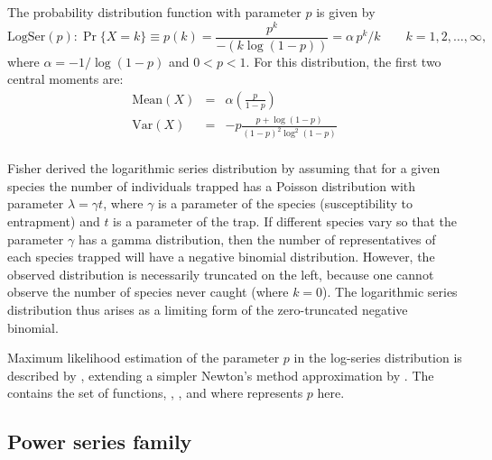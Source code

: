 \documentclass[10pt,krantz2]{krantz}\usepackage[]{graphicx}\usepackage[]{color}
\begin{document}
The probability distribution function with parameter $p$ is given by
\begin{equation}\label{eq:logseriesf}
\textrm{LogSer}(p): \Pr \{ X = k \} \equiv p ( k )  =
\frac{p^k}{-(k\log (1-p ))} =
\alpha \, p^k / k
\quad\quad k = 1, 2, \dots, \infty
\comma
\end{equation}
where $\alpha = -1 / \log(1 - p)$
and $0 < p <1$.
For this distribution, the first two central moments are:
\begin{eqnarray*}
\textrm{Mean}(X) & = & \alpha \left(\frac{p}{1-p}\right)\\
\textrm{Var}(X) &  = & -p \frac{p + \log(1-p)}{(1-p)^2 \log^2(1-p)}\\
\end{eqnarray*}


Fisher derived the logarithmic series distribution by assuming that
for a given species the number of individuals trapped has a Poisson
distribution with parameter $\lambda = \gamma t$, where
$\gamma$ is a parameter of the species (susceptibility to entrapment)
and $t$ is a parameter of the trap.
If different species vary so that the parameter $\gamma$ has a gamma
distribution, then the number of representatives of each species trapped
will have a negative binomial distribution.
However, the observed distribution is necessarily truncated on the left,
because one cannot observe the number of species never caught (where $k=0$).
The logarithmic series distribution thus arises as a limiting form of the
zero-truncated negative binomial.

Maximum likelihood estimation of the parameter $p$ in the log-series
distribution is described by \citet{Bohning:1983}, extending a simpler
Newton's method approximation by \citet{Birch:63}.
The  contains the
set of \R functions,
,
,
 and
 where  represents $p$ here.





\subsection{Power series family}\label{sec:pwrseries}
\end{document}

